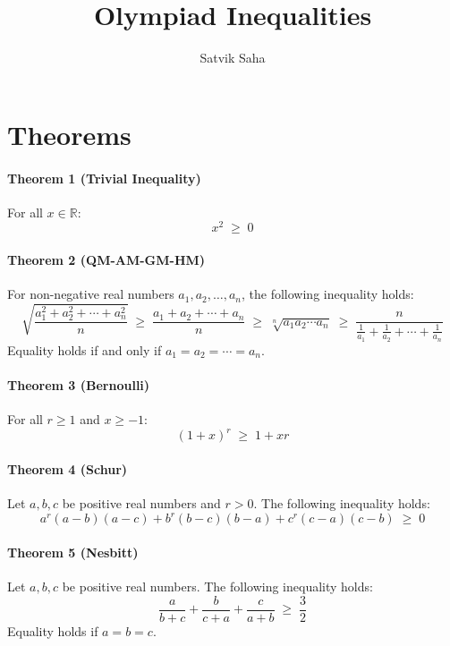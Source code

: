 \documentclass[11pt, reqno]{article}
\begin{document}
\title{Olympiad Inequalities}
\author{Satvik Saha}
\date{}
\maketitle

\section*{Theorems}

\begin{em}
\paragraph{Theorem 1 (Trivial Inequality)}
For all $x \in \mathbb{R}$:
\begin{equation*}
	x^2		\;\geq\;	0
\end{equation*}

\paragraph{Theorem 2 (QM-AM-GM-HM)}
For non-negative real numbers $a_1, a_2, \dots, a_n$, the following inequality holds:
\begin{equation*}
	\sqrt{\dfrac{a_1^2 + a_2^2 + \cdots + a_n^2}{n}}	\;\geq\;		\dfrac{a_1 + a_2 + \cdots + a_n}{n}		\;\geq\;
	\sqrt[n]{a_1a_2\cdots a_n}		\;\geq\;		\dfrac{n}{\frac{1}{a_1} + \frac{1}{a_2} + \cdots + \frac{1}{a_n}}
\end{equation*}
Equality holds if and only if $a_1 = a_2 = \cdots = a_n$.

\paragraph{Theorem 3 (Bernoulli)}
For all $r \geq 1$ and $x \geq -1$:
\begin{equation*}
	(1 + x)^r	\;\geq\;		1 + xr
\end{equation*}

\paragraph{Theorem 4 (Schur)}
Let $a, b, c$ be positive real numbers and $r > 0$. The following inequality holds:
\begin{equation*}
	a^r(a-b)(a-c) + b^r(b-c)(b-a) + c^r(c-a)(c-b)	\;\geq\;		0
\end{equation*}

\paragraph{Theorem 5 (Nesbitt)}
Let $a, b, c$ be positive real numbers. The following inequality holds:
\begin{equation*}
	\dfrac{a}{b+c} + \dfrac{b}{c+a} + \dfrac{c}{a+b}		\;\geq\;		\dfrac{3}{2}
\end{equation*}
Equality holds if $a = b = c$.


\end{em}
\end{document}
